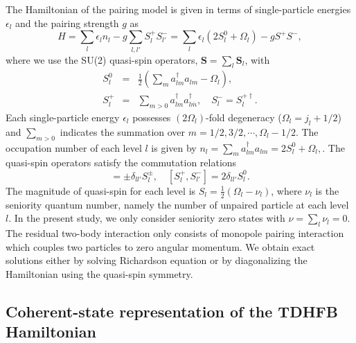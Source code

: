 \documentclass[%
superscriptaddress,
preprint,
showpacs,
nofootinbib,
amsmath,amssymb,
aps,
prc,
floatfix ]%
{revtex4-1}
\begin{document}
The Hamiltonian of the pairing model is given in terms of
single-particle energies $\epsilon_l$ and the pairing strength $g$ as
\begin{equation}
	H = \sum_l \epsilon_l n_l - g \sum_{l,l'} S_l^+ S_{l'}^-
    = \sum_l\epsilon_l(2S_l^0+\Omega_l) - g S^+ S^{-} ,
\end{equation}
where we use the SU(2) quasi-spin operators,
$\boldsymbol{S}=\sum_l \boldsymbol{S}_l$, with
\begin{eqnarray}
        S_l^0 &=& \frac{1}{2}(\sum_ma_{lm}^{\dag}a_{lm}-\Omega_l) ,\\
        S_l^{+} &=& \sum_{m>0}a_{lm}^{\dag}a_{l\overline{m}}^{\dag} ,
\quad   S_l^{-} = S_l^{+\dag} .
\end{eqnarray}
Each single-particle energy $\epsilon_l$ possesses $(2\Omega_l)$-fold
degeneracy ($\Omega_l=j_l+1/2$)
and $\sum_{m>0}$ indicates the summation over $m=1/2,3/2,\cdots,\Omega_l-1/2$.
The occupation number of each level $l$ is given by
$
	n_l = \sum_m a^{\dag}_{lm}a_{lm} = 2S_l^0+\Omega_l ,
$.
The quasi-spin operators satisfy the commutation relations
\begin{equation}
  [S_l^0,S_{l'}^{\pm}] = \pm\delta_{ll'}S_{l}^{\pm},
	\quad [S_{l}^{+},S_{l'}^{-}] = 2\delta_{ll'}S_{l}^{0} .
\end{equation}
The magnitude of quasi-spin for each level is
$S_l=\frac{1}{2}(\Omega_l-\nu_l)$, where $\nu_l$ is the seniority
quantum number, namely the number of unpaired particle at each level $l$.
In the present study, we only consider seniority zero states with
$\nu=\sum_l \nu_l=0$.
The residual two-body interaction only consists of monopole pairing
interaction which couples two particles to zero angular momentum.
We obtain exact solutions either by solving Richardson equation
\cite{Richardson,Richardson2,Richardson3} or
by diagonalizing the Hamiltonian using the quasi-spin symmetry.


\subsection{Coherent-state representation of the TDHFB Hamiltonian}
\end{document}
